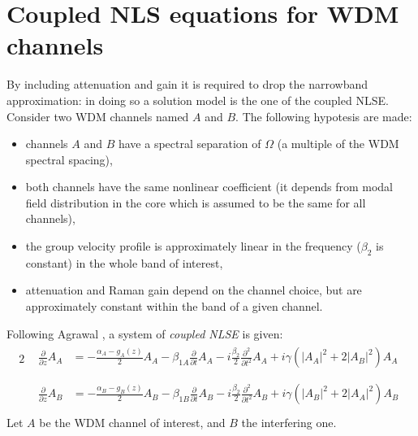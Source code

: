 \documentclass[10pt, lettersize, journal, onecolumn]{IEEEtran}
\begin{document}

\section{Coupled NLS equations for WDM channels} \label{framework}
By including attenuation and gain it is required to drop the narrowband approximation: in doing so a solution model is the one of the coupled NLSE.\\
Consider two WDM channels named $A$ and $B$.
The following hypotesis are made:
\begin{itemize}
 \item channels $A$ and $B$ have a spectral separation of $\Omega$ (a multiple of the WDM spectral spacing),
 \item both channels have the same nonlinear coefficient (it depends from modal field distribution in the core which is assumed to be the same for all channels),
 \item the group velocity profile is approximately linear in the frequency ($\beta_2$ is constant) in the whole band of interest,
 \item attenuation and Raman gain depend on the channel choice, but are approximately constant within the band of a given channel.
\end{itemize}
Following Agrawal \cite[p.263]{Agrawal}, a system of \textit{coupled NLSE} is given:
\begin{alignat}{2}
    &\begin{aligned}
        \frac{\partial}{\partial z} A_A &= -\frac{\alpha_A - g_A(z)}{2}A_A - \beta_{1A} \frac{\partial}{\partial t} A_A -  i \frac{\beta_2}{2} \frac{\partial^2}{\partial t^2} A_A + i \gamma (|A_A|^2 +2 |A_B|^2)A_A \\
    \end{aligned}\label{eq:nlA} \\
    &\begin{aligned}
        \frac{\partial}{\partial z} A_B &= -\frac{\alpha_B - g_B(z)}{2}A_B - \beta_{1B} \frac{\partial}{\partial t} A_B - i \frac{\beta_2}{2} \frac{\partial^2}{\partial t^2} A_B + i \gamma (|A_B|^2 +2 |A_A|^2)A_B \\
    \end{aligned}\label{eq:nlB}
\end{alignat}
Let $A$ be the WDM channel of interest, and $B$ the interfering one.
\end{document}
